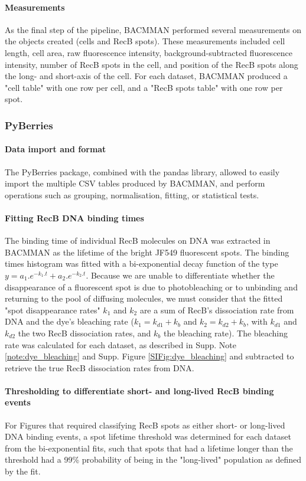 \paragraph*{Measurements}
As the final step of the pipeline, BACMMAN performed several measurements on the objects created (cells and RecB spots). These measurements included cell length, cell area, raw fluorescence intensity, background-subtracted fluorescence intensity, number of RecB spots in the cell, and position of the RecB spots along the long- and short-axis of the cell. For each dataset, BACMMAN produced a "cell table" with one row per cell, and a "RecB spots table" with one row per spot.

\subsubsection*{PyBerries}
\paragraph*{Data import and format}
The PyBerries package, combined with the pandas library, allowed to easily import the multiple CSV tables produced by BACMMAN, and perform operations such as grouping, normalisation, fitting, or statistical tests.

\paragraph*{Fitting RecB DNA binding times}  %
The binding time of individual RecB molecules on DNA was extracted in BACMMAN as the lifetime of the bright JF549 fluorescent spots. The binding times histogram was fitted with a bi-exponential decay function of the type $y=a_1.e^{-k_1.t} + a_2.e^{-k_2.t}$. Because we are unable to differentiate whether the disappearance of a fluorescent spot is due to photobleaching or to unbinding and returning to the pool of diffusing molecules, we must consider that the fitted "spot disappearance rates" $k_1$ and $k_2$ are a sum of RecB's dissociation rate from DNA and the dye's bleaching rate ($k_1=k_{d1}+k_b$ and $k_2=k_{d2}+k_b$, with $k_{d1}$ and $k_{d2}$ the two RecB dissociation rates, and $k_b$ the bleaching rate). The bleaching rate was calculated for each dataset, as described in Supp. Note \ref{note:dye_bleaching} and Supp. Figure \ref{SIFig:dye_bleaching} and subtracted to retrieve the true RecB dissociation rates from DNA.

\paragraph*{Thresholding to differentiate short- and long-lived RecB binding events}
For Figures that required classifying RecB spots as either short- or long-lived DNA binding events, a spot lifetime threshold was determined for each dataset from the bi-exponential fits, such that spots that had a lifetime longer than the threshold had a 99\% probability of being in the "long-lived" population as defined by the fit.

